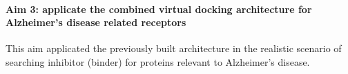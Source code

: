 \paragraph{Aim 3: applicate the combined virtual docking architecture for Alzheimer’s disease related receptors} 
This aim applicated the previously built architecture in the realistic scenario of searching inhibitor (binder) for proteins relevant to Alzheimer’s disease.
